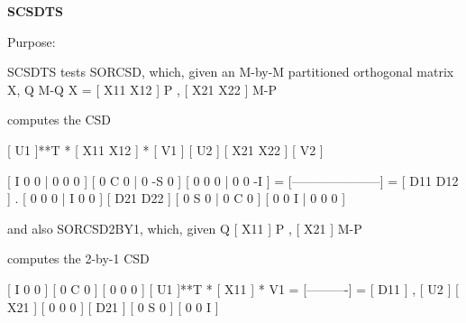 {\bfseries S\+C\+S\+D\+T\+S} 

\begin{DoxyParagraph}{Purpose\+: }
\begin{DoxyVerb} SCSDTS tests SORCSD, which, given an M-by-M partitioned orthogonal
 matrix X,
              Q  M-Q
       X = [ X11 X12 ] P   ,
           [ X21 X22 ] M-P

 computes the CSD

       [ U1    ]**T * [ X11 X12 ] * [ V1    ]
       [    U2 ]      [ X21 X22 ]   [    V2 ]

                             [  I  0  0 |  0  0  0 ]
                             [  0  C  0 |  0 -S  0 ]
                             [  0  0  0 |  0  0 -I ]
                           = [---------------------] = [ D11 D12 ] .
                             [  0  0  0 |  I  0  0 ]   [ D21 D22 ]
                             [  0  S  0 |  0  C  0 ]
                             [  0  0  I |  0  0  0 ]

 and also SORCSD2BY1, which, given
          Q
       [ X11 ] P   ,
       [ X21 ] M-P

 computes the 2-by-1 CSD

                                     [  I  0  0 ]
                                     [  0  C  0 ]
                                     [  0  0  0 ]
       [ U1    ]**T * [ X11 ] * V1 = [----------] = [ D11 ] ,
       [    U2 ]      [ X21 ]        [  0  0  0 ]   [ D21 ]
                                     [  0  S  0 ]
                                     [  0  0  I ]\end{DoxyVerb}
 
\end{DoxyParagraph}

